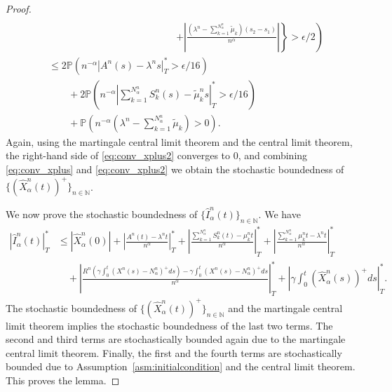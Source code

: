 \documentclass[a4paper,11pt,twoside]{article}
\numberwithin{equation}{section}
\numberwithin{figure}{section}
\theoremstyle{plain}
\newcommand{\NN}{\mathbb{N}}
\newcommand{\PP}{\mathbb{P}}
\newcommand{\1}{\mathbbm{1}}
\begin{document}
\begin{proof}
\begin{align}
 \\
\nonumber&\qquad\qquad\qquad\qquad\qquad\qquad\quad\left.\left.+\left|\frac{(\lambda^n-\sum_{k=1}^{N_\alpha^n}\tilde{\mu}_k)(s_2-s_1)}{n^\alpha}\right|\right\}>\epsilon/2\right)
 \\
 \nonumber&\leq 2\PP\left(n^{-\alpha}|A^n(s)-\lambda^ns|_T^*>\epsilon/16\right)\\
 \nonumber&\qquad+2\PP\left(n^{-\alpha}\left|\sum_{k=1}^{N_\alpha^n}S_k^n(s)-\tilde{\mu}_k^ns\right|_T^*>\epsilon/16\right)\\
 &\qquad+\PP\left(n^{-\alpha}\left(\lambda^n-\sum_{k=1}^{N_\alpha^n}\tilde{\mu}_k\right)>0\right).\label{eq:conv_xplus2}
\end{align}
Again, using the martingale central limit theorem and the central limit theorem, the right-hand side of \eqref{eq:conv_xplus2} converges to $0$, and combining \eqref{eq:conv_xplus} and \eqref{eq:conv_xplus2} we obtain the stochastic boundedness of $\{(\hat{X}_\alpha^n(t))^+\}_{n\in \NN}$. 

We now prove the stochastic boundedness of $\{\hat{I}_\alpha^n(t)\}_{n\in\NN}$. 
We have 
\begin{align*}
    \left|\hat{I}_\alpha^n(t)\right|_T^*&\leq \left|\hat{X}_\alpha^n(0)\right|+\left|\frac{A^n(t)-\lambda^nt}{n^{\alpha}}\right|_T^*+\left|\frac{\sum_{k=1}^{N_\alpha^n}S_k^n(t)-\mu_k^nt}{n^{\alpha}}\right|_T^*+\left|\frac{\sum_{k=1}^{N_\alpha^n}\mu_k^nt-\lambda^nt}{n^{\alpha}}\right|_T^*\\
    &\quad + \left|\frac{R^n\left(\gamma\int_0^t(X^n(s)-N_\alpha^n)^+ds\right)-\gamma\int_0^t(X^n(s)-N_\alpha^n)^+ds}{n^\alpha}\right|_T^*+\left|\gamma\int_0^t(\hat{X}_\alpha^n(s))^+ds\right|_T^*.
\end{align*}
The stochastic boundedness of $\{(\hat{X}_\alpha^n(t))^+\}_{n\in \NN}$ and the martingale central limit theorem implies the stochastic boundedness of the last two terms. The second and third terms are stochastically bounded again due to the martingale central limit theorem. Finally, the first and the fourth terms are stochastically bounded due to Assumption~\ref{asm:initialcondition} and the central limit theorem. This proves the lemma.
\end{proof}
\endproof
\end{document}
